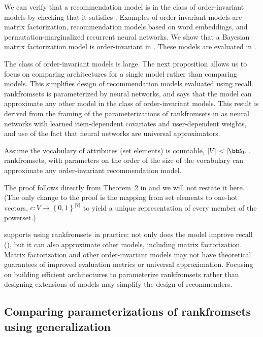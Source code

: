 We can verify that a recommendation model is in the class of order-invariant
models by checking that it satisfies . Examples of
order-invariant models are matrix factorization, recommendation models based on
word embeddings, and permutation-marginalized recurrent neural networks.
We show that a Bayesian matrix factorization model \citep{Gopalana} is
order-invariant in . These models are evaluated in
.

The class of order-invariant models is large. The next proposition allows us to
focus on comparing architectures for a single model rather than comparing
models. This simplifies design of recommendation models evaluated using recall.
\acrshort{rankfromsets} is parameterized by neural networks, and 
says that the model can approximate any other model in the class of
order-invariant models. This result is derived from the framing of the
parameterizations of \acrshort{rankfromsets} in  as
neural networks with learned item-dependent covariates and user-dependent
weights, and use of the fact that neural networks are universal approximators.

\begin{proposition}
  Assume the vocabulary of attributes (set elements) is countable,
  $\lvert V \rvert < \lvert \bbN_0 \rvert$. \acrshort{rankfromsets}, with
  parameters on the order of the size of the vocabulary can approximate any
  order-invariant recommendation model.
  \label{prop:2}
\end{proposition}
The proof follows directly from Theorem~2 in
\citet{DBLP:journals/corr/ZaheerKRPSS17} and we will not restate it here. (The
only change to the proof is the mapping from set elements to one-hot vectors,
$c \colon V \to \left\{0, 1\right\}^{\lvert V \rvert}$ to yield a unique
representation of every member of the powerset.)

 supports using \acrshort{rankfromsets} in practice: not only does
the model improve recall (), but it can also approximate other
models, including matrix factorization. Matrix factorization and other
order-invariant models may not have theoretical guarantees of improved
evaluation metrics or universal approximation. Focusing on building efficient
architectures to parameterize \acrshort{rankfromsets} rather than designing
extensions of models may simplify the design of recommenders.

\subsection{Comparing parameterizations of \acrshort{rankfromsets} using
  generalization}
\label{sec:generalization}

